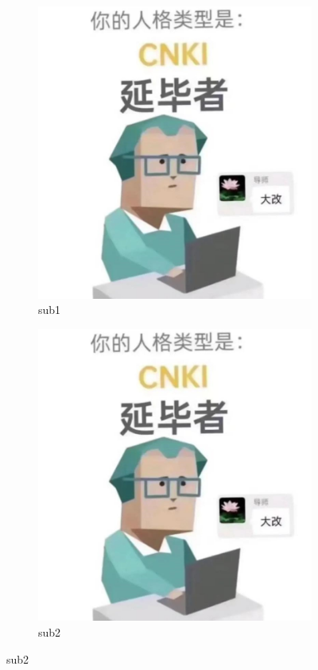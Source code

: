 \begin{figure}[!ht] \centering
	\begin{subfigure}[b]{0.49\textwidth}\centering
		\includegraphics[width=\textwidth]{./Graphs/example/example.jpeg}
		\caption{sub1}\label{subf::sub1}
	\end{subfigure}\hfill %
	\begin{subfigure}[b]{0.49\textwidth}\centering
		\includegraphics[width=\textwidth]{./Graphs/example/example.jpeg}
		\caption{sub2}\label{subf::sub2}
	\end{subfigure}
\end{figure}
